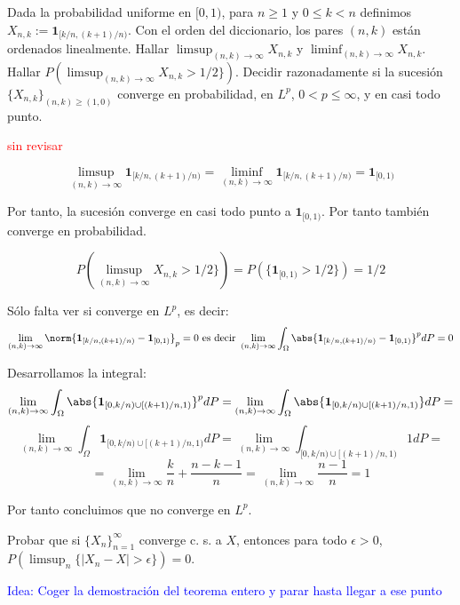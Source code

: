 \begin{problem}[7] Dada la probabilidad uniforme en $[0,1)$,  para $n \ge 1$ y $0 \le k < n$ definimos 
$X_{n,k} :=\mathbf{1}_{[k/n, (k + 1)/n)}$. Con el orden
del diccionario, los pares $(n,k)$ est\'an ordenados linealmente. Hallar  $\limsup_{(n,k)\to \infty} X_{n,k}$
y  $\liminf_{(n,k)\to \infty} X_{n,k}$. Hallar $P(\limsup_{(n,k)\to \infty} X_{n,k} > 1/2\})$.
Decidir razonadamente si la sucesi\'on  $\{ X_{n,k}\}_{(n, k) \ge (1,0)} $
converge en probabilidad, en $L^p$,  $0 < p \le \infty$, y  en casi todo punto.


\solution
\textcolor{red}{sin revisar}

\[
\limsup_{(n,k)\to \infty} \mathbf{1}_{[k/n, (k + 1)/n)} = \liminf_{(n,k)\to \infty} \mathbf{1}_{[k/n, (k + 1)/n)} = \mathbf{1}_{[0,1)}
\]

Por tanto, la sucesión converge en casi todo punto a $\mathbf{1}_{[0,1)}$. Por tanto también converge en probabilidad.

\[
P(\limsup_{(n,k)\to \infty} X_{n,k} > 1/2\}) = P(\{\mathbf{1}_{[0,1)} > 1/2\}) = 1/2
\]

Sólo falta ver si converge en $L^p$, es decir:
\[
\lim_{(n,k) \rightarrow \infty} \norm{\mathbf{1}_{[k/n, (k + 1)/n)} -\mathbf{1}_{[0,1)}}_p = 0 \text{ es decir } \lim_{(n,k) \rightarrow \infty} \int_{\Omega} \abs{\mathbf{1}_{[k/n, (k + 1)/n)} -\mathbf{1}_{[0,1)}}^p dP = 0
\]

Desarrollamos la integral:
\[
\lim_{(n,k) \rightarrow \infty} \int_{\Omega} \abs{\mathbf{1}_{[0,k/n)\cup[(k + 1)/n,1)}}^p dP = \lim_{(n,k) \rightarrow \infty} \int_{\Omega} \abs{\mathbf{1}_{[0,k/n)\cup[(k + 1)/n,1)}} dP = 
\]
\[
\lim_{(n,k) \rightarrow \infty} \int_{\Omega} \mathbf{1}_{[0,k/n)\cup[(k + 1)/n,1)} dP = \lim_{(n,k) \rightarrow \infty} \int_{[0,k/n)\cup[(k + 1)/n,1)} 1 dP =
\]
\[
= \lim_{(n,k) \rightarrow \infty} \frac{k}{n}+\frac{n-k-1}{n} = \lim_{(n,k) \rightarrow \infty} \frac{n-1}{n} = 1
\]

Por tanto concluimos que no converge en $L^p$.


\end{problem}


\begin{problem}[8]Probar que si $\{X_n\}_{n=1}^{\infty}$  converge c. s. a $X$, entonces para todo $\epsilon > 0$,
$P(\limsup_n\{ |X_n - X| > \epsilon\}) = 0$.


\solution
\textcolor{blue}{Idea: Coger la demostración del teorema entero y parar hasta llegar a ese punto}

\end{problem}

